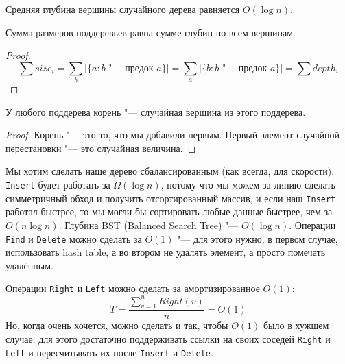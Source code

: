 \begin{theorem}{}
	Средняя глубина вершины случайного дерева равняется $O(\log n)$.
\end{theorem}
\begin{lemma}
	Сумма размеров поддеревьев равна сумме глубин по всем вершинам.
\end{lemma}
\begin{proof}
	\[ 
		\sum size_{i} = \sum_{b} |\{a \colon \text{$b$ "--- предок $a$}\}| = 
		\sum_{a} |\{b \colon \text{$b$ "--- предок $a$} \}| = \sum depth_{i} 
	\]
\end{proof}

\begin{lemma}
	У любого поддерева корень "--- случайная вершина из этого поддерева.
\end{lemma}
\begin{proof}
	Корень "--- это то, что мы добавили первым. Первый элемент случайной перестановки "--- это случайная величина.
\end{proof}

Мы хотим сделать наше дерево сбалансированным (как всегда, для скорости).
\texttt{Insert} будет работать за $\Omega(\log n)$, потому что 
мы можем за линию сделать симметричный обход и получить отсортированный массив, и 
если наш \texttt{Insert} работал быстрее, то мы могли бы сортировать 
любые данные быстрее, чем за $O(n \log n)$. 
Глубина BST (Balanced Search Tree) "--- $O(\log n)$. 
Операции \texttt{Find} и \texttt{Delete} можно сделать за $O(1)$ "--- для этого нужно, 
в первом случае, использовать hash table, а во втором не удалять элемент, 
а просто помечать удалённым.

Операции \texttt{Right} и \texttt{Left} можно сделать за амортизированное $O(1)$:
\[ T = \frac{\sum_{v = 1}^{n}Right(v)}{n} = O(1) \]
Но, когда очень хочется, можно сделать и так, чтобы $O(1)$ было в хужшем случае: для этого достаточно поддерживать ссылки на своих соседей \texttt{Right} и \texttt{Left} 
и пересчитывать их после \texttt{Insert} и \texttt{Delete}.

